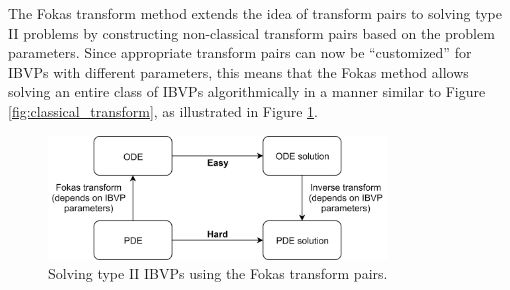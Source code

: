 \documentclass[11pt, oneside, a4paper]{article}
\begin{document}
The Fokas transform method \cite{Fokas2008} extends the idea of transform pairs to solving type II problems by constructing non-classical transform pairs based on the problem parameters. Since appropriate transform pairs can now be ``customized'' for IBVPs with different parameters, this means that the Fokas method allows solving an entire class of IBVPs algorithmically in a manner similar to Figure \ref{fig:classical_transform}, as illustrated in Figure \ref{fig:fokas_transform}.
\begin{figure}[htpb!]
    \centering
    \includegraphics[width=0.8\textwidth]{fokas_transform.png}
    \caption{Solving type II IBVPs using the Fokas transform pairs.}
    \label{fig:fokas_transform}
\end{figure}
\end{document}
